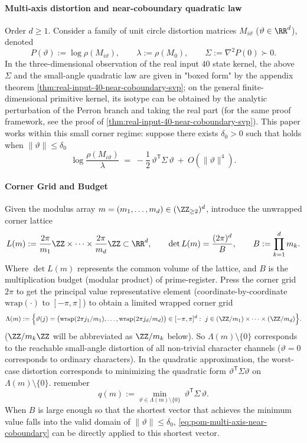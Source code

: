 \paragraph{Multi-axis distortion and near-coboundary quadratic law}
Order \(d\ge 1\).
Consider a family of unit circle distortion matrices \(M_{i\vartheta}\) (\(\vartheta\in\RR^d\)), denoted
\[
P(\vartheta):=\log\rho(M_{i\vartheta}),\qquad \lambda:=\rho(M_{0}),\qquad \Sigma:=\nabla^2P(0)\succ 0.
\]
In the three-dimensional observation of the real input \(40\) state kernel, the above \(\Sigma\) and the small-angle quadratic law are given in "boxed form" by the appendix theorem \ref{thm:real-input-40-near-coboundary-svp}; on the general finite-dimensional primitive kernel, its isotype can be obtained by the analytic perturbation of the Perron branch and taking the real part (for the same proof framework, see the proof of \ref{thm:real-input-40-near-coboundary-svp}).
This paper works within this small corner regime: suppose there exists \(\delta_0>0\) such that holds when \(\|\vartheta\|\le \delta_0\)
\begin{equation}\label{eq:pom-multi-axis-near-coboundary}
\log\frac{\rho(M_{i\vartheta})}{\lambda}
\;=\;
-\frac12\,\vartheta^{\mathsf T}\Sigma\,\vartheta\ +\ O(\|\vartheta\|^4).
\end{equation}

\paragraph{Corner Grid and Budget}
Given the modulus array \(m=(m_1,\dots,m_d)\in(\ZZ_{\ge 2})^d\), introduce the unwrapped corner lattice
\[
L(m):=\frac{2\pi}{m_1}\ZZ\times\cdots\times\frac{2\pi}{m_d}\ZZ\subset\RR^d,
\qquad
\det L(m)=\frac{(2\pi)^d}{B},
\qquad
B:=\prod_{k=1}^d m_k.
\]
Where \(\det L(m)\) represents the common volume of the lattice, and \(B\) is the multiplication budget (modular product) of prime-register.
Press the corner grid \(2\pi\) to get the principal value representative element (coordinate-by-coordinate \(\mathrm{wrap}(\cdot)\) to \([-\pi,\pi]\)) to obtain a limited wrapped corner grid
\[
\Lambda(m):=\Bigl\{\vartheta(j)
=\bigl(\mathrm{wrap}(2\pi j_1/m_1),\dots,\mathrm{wrap}(2\pi j_d/m_d)\bigr)\in[-\pi,\pi]^d:\ j\in(\ZZ/m_1)\times\cdots\times(\ZZ/m_d)\Bigr\}.
\]
(\(\ZZ/m_k\ZZ\) will be abbreviated as \(\ZZ/m_k\) below).
So \(\Lambda(m)\setminus\{0\}\) corresponds to the reachable small-angle distortion of all non-trivial character channels (\(\vartheta=0\) corresponds to ordinary characters).
In the quadratic approximation, the worst-case distortion corresponds to minimizing the quadratic form \(\vartheta^{\mathsf T}\Sigma\vartheta\) on \(\Lambda(m)\setminus\{0\}\).
remember
\begin{equation}\label{eq:pom-multi-axis-qm}
q(m):=\min_{\vartheta\in\Lambda(m)\setminus\{0\}}\ \vartheta^{\mathsf T}\Sigma\,\vartheta.
\end{equation}
When \(B\) is large enough so that the shortest vector that achieves the minimum value falls into the valid domain of \(\|\vartheta\|\le\delta_0\), \eqref{eq:pom-multi-axis-near-coboundary} can be directly applied to this shortest vector.

